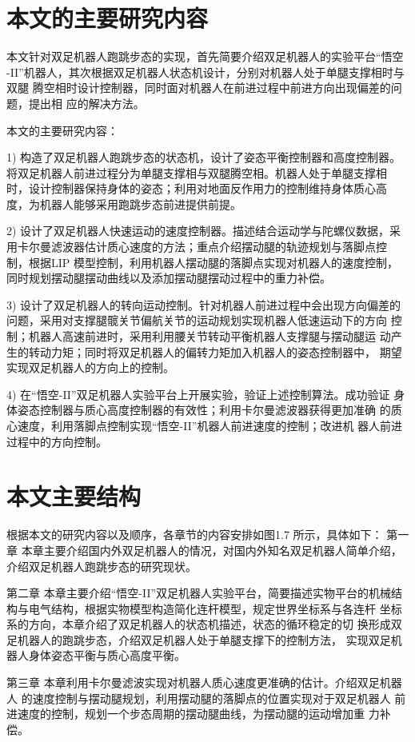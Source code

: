 \section{本文的主要研究内容}
本文针对双足机器人跑跳步态的实现，首先简要介绍双足机器人的实验平台“悟空
-II”机器人，其次根据双足机器人状态机设计，分别对机器人处于单腿支撑相时与双腿
腾空相时设计控制器，同时面对机器人在前进过程中前进方向出现偏差的问题，提出相
应的解决方法。

本文的主要研究内容：

1) 构造了双足机器人跑跳步态的状态机，设计了姿态平衡控制器和高度控制器。
将双足机器人前进过程分为单腿支撑相与双腿腾空相。机器人处于单腿支撑相
时，设计控制器保持身体的姿态；利用对地面反作用力的控制维持身体质心高
度，为机器人能够采用跑跳步态前进提供前提。

2) 设计了双足机器人快速运动的速度控制器。描述结合运动学与陀螺仪数据，采
用卡尔曼滤波器估计质心速度的方法；重点介绍摆动腿的轨迹规划与落脚点控
制，根据LIP 模型控制，利用机器人摆动腿的落脚点实现对机器人的速度控制，
同时规划摆动腿摆动曲线以及添加摆动腿摆动过程中的重力补偿。

3) 设计了双足机器人的转向运动控制。针对机器人前进过程中会出现方向偏差的
问题，采用对支撑腿髋关节偏航关节的运动规划实现机器人低速运动下的方向
控制；机器人高速前进时，采用利用腰关节转动平衡机器人支撑腿与摆动腿运
动产生的转动力矩；同时将双足机器人的偏转力矩加入机器人的姿态控制器中，
期望实现双足机器人的方向上的控制。

4) 在“悟空-II”双足机器人实验平台上开展实验，验证上述控制算法。成功验证
身体姿态控制器与质心高度控制器的有效性；利用卡尔曼滤波器获得更加准确
的质心速度，利用落脚点控制实现“悟空-II”机器人前进速度的控制；改进机
器人前进过程中的方向控制。

\section{本文主要结构}
根据本文的研究内容以及顺序，各章节的内容安排如图1.7 所示，具体如下：
第一章 本章主要介绍国内外双足机器人的情况，对国内外知名双足机器人简单介绍，
介绍双足机器人跑跳步态的研究现状。

第二章 本章主要介绍“悟空-II”双足机器人实验平台，简要描述实物平台的机械结
构与电气结构，根据实物模型构造简化连杆模型，规定世界坐标系与各连杆
坐标系的方向，本章介绍了双足机器人的状态机描述，状态的循环稳定的切
换形成双足机器人的跑跳步态，介绍双足机器人处于单腿支撑下的控制方法，
实现双足机器人身体姿态平衡与质心高度平衡。

第三章 本章利用卡尔曼滤波实现对机器人质心速度更准确的估计。介绍双足机器人
的速度控制与摆动腿规划，利用摆动腿的落脚点的位置实现对于双足机器人
前进速度的控制，规划一个步态周期的摆动腿曲线，为摆动腿的运动增加重
力补偿。

